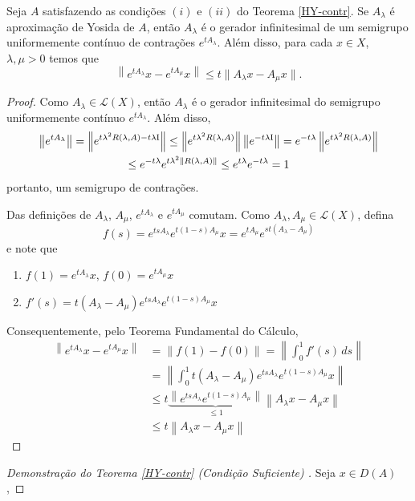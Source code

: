 \begin{lemma}
Seja $A$ satisfazendo as condições $(i)$ e $(ii)$ do Teorema \ref{HY-contr}. Se $A_\lambda$ é  aproximação de Yosida de $A$, então $A_\lambda$ é o gerador infinitesimal de um semigrupo uniformemente contínuo de contrações $e^{tA_\lambda}$. Além disso, para cada $x\in X$, $\lambda,\mu>0$ temos que
\begin{equation*}
\left\|e^{tA_\lambda}x-e^{tA_\mu}x\right\|\leq t\|A_\lambda x-A_\mu x\|.
\end{equation*}
\end{lemma}
\begin{proof}
Como $A_\lambda \in \mathcal{L}(X)$, então $A_\lambda$ é o gerador infinitesimal do semigrupo uniformemente contínuo $e^{tA_\lambda}$. Além disso,
\begin{multline*}
\left\|e^{tA_\lambda}\right\|
 =\left\|e^{t\lambda^2R(\lambda,A)-t\lambda \operatorname{\!I}}\right\|
\leq \left\|e^{t\lambda^2R(\lambda,A)}\right\|\left\|e^{-t\lambda \operatorname{\!I}} \right\|
=e^{-t\lambda }\left\|e^{t\lambda^2R(\lambda,A)}\right\|\\ 
\leq e^{-t\lambda }e^{t\lambda^2\left\|R(\lambda,A)\right\|}
 \leq e^{t\lambda }e^{-t\lambda }=1
\end{multline*}
portanto, um semigrupo de contrações.

Das definições de $A_\lambda$, $A_\mu$, $e^{tA_\lambda}$ e $e^{tA_\mu}$ 
comutam. Como $A_\lambda,  A_\mu\in\mathcal{L}(X)$, defina 
\[f(s)=e^{tsA_\lambda}e^{t(1-s)A_\mu}x=e^{tA_\mu}e^{st(A_\lambda-A_\mu)} \]
e note que
\begin{enumerate}
\item $f(1)=e^{tA_\lambda}x$, $f(0)=e^{tA_\mu}x$
\item $f'(s)=t(A_\lambda-A_\mu)e^{tsA_\lambda}e^{t(1-s)A_\mu}x$
\end{enumerate}
Consequentemente, pelo Teorema Fundamental do Cálculo,
\begin{align*}
\left\|e^{tA_\lambda}x-e^{tA_\mu}x \right\|
& =\left\|f(1)-f(0) \right\|=
\left\|\int_0^1 f'(s)\,ds \right\|\\
& =\left\|\int_0^1 
t(A_\lambda-A_\mu)e^{tsA_\lambda}e^{t(1-s)A_\mu}x\right\|\\
& \leq t\underbrace{\left\|e^{tsA_\lambda}e^{t(1-s)A_\mu}\right\|}_{\leq 1}   \left\|A_\lambda x-A_\mu x\right\|\\
& \leq t \left\|A_\lambda x-A_\mu x\right\|
\end{align*}
\end{proof}

\begin{proof}[Demonstração do Teorema {\ref{HY-contr}} (Condição Suficiente) ]
Seja $x\in D(A)$,
\end{proof}










